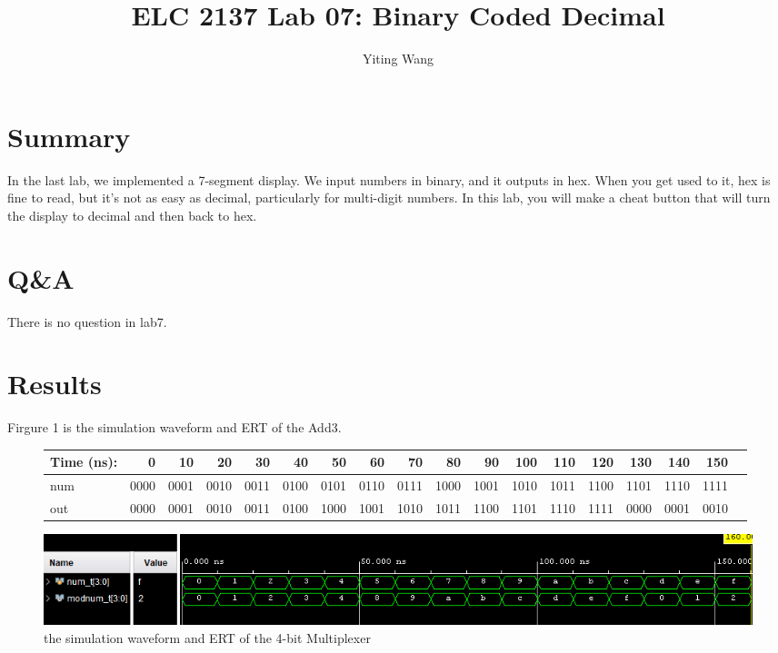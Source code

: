 \documentclass[11pt]{article}
\begin{document}
\title{ELC 2137 Lab 07: Binary Coded Decimal}
\author{Yiting Wang}

\maketitle


\section*{Summary}

In the last lab, we implemented a 7-segment display. We input numbers in binary, and it outputs in hex. When you get used to it, hex is fine to read, but it’s not as easy as decimal,  particularly for multi-digit numbers. In this lab, you will make a cheat button that will turn the display to decimal and then back to hex.  \\



\section*{Q\&A}

There is no question in lab7.\\



\section*{Results}

	Firgure 1 is the simulation waveform and ERT of the Add3.\\
	\begin{figure}[ht]\centering
		\begin{tabular}{l|rrrr|rrrr|rrrr|rrrr|r}
			Time (ns): & 0 & 10 & 20 & 30 & 40 & 50 & 60 & 70 & 80 & 90 & 100 & 110 & 120 & 130 & 140 & 150 \\
			\midrule
			num & 0000 & 0001 & 0010 & 0011 & 0100 & 0101 & 0110 & 0111 & 1000 & 1001 & 1010 & 1011 & 1100 & 1101 & 1110 & 1111 \\
			\midrule
			out & 0000 & 0001 & 0010 & 0011 & 0100 & 1000 & 1001 & 1010 & 1011 & 1100 & 1101 & 1110 & 1111 & 0000 & 0001 & 0010 \\
			\bottomrule
		\end{tabular}\medskip
		
		\includegraphics[width=1\textwidth]{add3_simulate}
		\caption{the simulation waveform and ERT of the 4-bit Multiplexer}
		\label{fig:add3_simulate}
	\end{figure}
\end{document}
